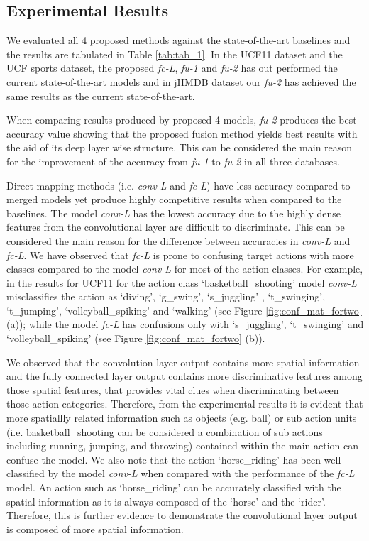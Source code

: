 \documentclass[10pt,twocolumn,letterpaper]{article}
\begin{document}
\subsection{Experimental Results}

We evaluated all 4 proposed methods against the state-of-the-art baselines and the results are tabulated in Table \ref{tab:tab_1}. In the UCF11 dataset and the UCF sports dataset, the proposed \textit{fc-L}, \textit{fu-1} and \textit{fu-2} has out performed the current state-of-the-art models and in jHMDB dataset our \textit{fu-2} has achieved the same results as the current state-of-the-art.


When comparing results produced by proposed 4 models, \textit{fu-2} produces the best accuracy value showing that the proposed fusion method yields best results with the aid of its deep layer wise structure. This can be considered the main reason for the improvement of the accuracy from \textit{fu-1} to \textit{fu-2} in all three databases.

Direct mapping methods (i.e. \textit{conv-L} and \textit{fc-L}) have less accuracy compared to merged models yet produce highly competitive results when compared to the baselines. The model \textit{conv-L} has the lowest accuracy due to the highly dense features from the convolutional layer are difficult to discriminate. This can be considered the main reason for the difference between accuracies in \textit{conv-L} and \textit{fc-L}. We have observed that \textit{fc-L} is prone to confusing target actions with more classes compared to the model \textit{conv-L} for most of the action classes. For example, in the results for UCF11 for the action class `basketball\_shooting' model \textit{conv-L} misclassifies the action as `diving', `g\_swing', `s\_juggling' , `t\_swinging', `t\_jumping', `volleyball\_spiking' and `walking' (see Figure \ref{fig:conf_mat_fortwo} (a));  while the model  \textit{fc-L} has confusions only with `s\_juggling', `t\_swinging' and `volleyball\_spiking' (see Figure \ref{fig:conf_mat_fortwo} (b)). 

We observed that the convolution layer output contains more spatial information and the fully connected layer output contains more discriminative features among those spatial features, that provides vital clues when discriminating between those action categories. Therefore, from the experimental results it is evident that more spatiallly related information such as objects (e.g. ball) or sub action units (i.e. basketball\_shooting can be considered a combination of sub actions including running, jumping, and throwing) contained within the main action can confuse the model. We also note that the action `horse\_riding' has been well classified by the model \textit{conv-L}  when compared with the performance of the \textit{fc-L} model. An action such as `horse\_riding' can be accurately classified with the spatial information as it is always composed of the `horse' and the `rider'. Therefore, this is further evidence to demonstrate the convolutional layer output is composed of more spatial information. 
\end{document}
